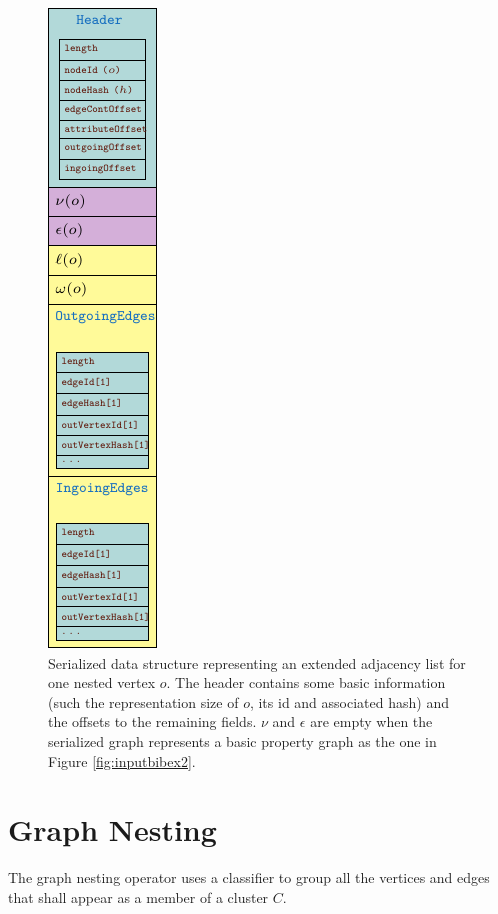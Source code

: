 \begin{figure}[!ht]
	\centering
	\includegraphics[height=.7\textheight,angle =90]{images/nesting/patterns/test}
	\caption{Serialized data structure representing an extended adjacency list for one nested vertex $o$. The header contains some basic information (such the representation size of $o$, its id and associated hash) and the offsets to the remaining fields. $\nu$ and $\epsilon$ are empty when the serialized graph represents a basic property graph as the one in Figure \ref{fig:inputbibex2}.}\label{nestedGraphVertex}
\end{figure}
\section{Graph Nesting}\label{sec:nestingdef}
The graph nesting operator uses a classifier to group all the vertices and edges that shall appear as a member of a cluster $C$. 


